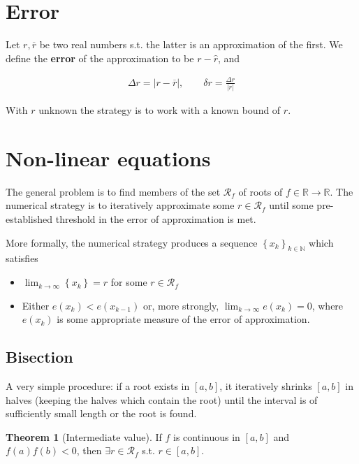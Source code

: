 \documentclass[12pt]{article}
\theoremstyle{definition}
\newtheorem{theorem}{Theorem}
\begin{document}
\pagebreak 

\section{Error}

Let $r, \overline{r}$ be two real numbers s.t. the latter is an approximation of
the first. We define the \textbf{error} of the approximation to be $r -
\hat{r}$, and 

\begin{align*}
    \Delta r = \left| r - \overline{r} \right|, \qquad \delta r = \frac{\Delta
    r}{\left| r \right| }
\end{align*}

With $r$ unknown the strategy is to work with a known bound of $r$.

\pagebreak 

\section{Non-linear equations}

The general problem is to find members of the set $\mathcal{R}_f$ of roots of $f
\in \mathbb{R} \to \mathbb{R}$. The numerical strategy is to iteratively
approximate some $r \in \mathcal{R}_f$ until some pre-established threshold in
the error of approximation is met. 

More formally, the numerical strategy produces a sequence $\left\{ x_k
\right\}_{k\in \mathbb{N}}
$ which satisfies 

\begin{itemize}
    \item $\lim_{k\to \infty} \left\{ x_k \right\} = r$  for some $r \in
        \mathcal{R}_f$ 
    \item Either $e(x_k) < e(x_{k-1})$ or, more strongly, $\lim_{k\to \infty}
        e(x_k) = 0$, where $e(x_k)$ is some appropriate measure of the error of
        approximation.
\end{itemize}

\subsection{Bisection}

A very simple procedure: if a root exists in $[a, b]$, it iteratively shrinks
$[a,b]$ in halves (keeping the halves which contain the root) until the interval
is of sufficiently small length or the root is found.

\begin{theorem}[Intermediate value]
    If $f$ is continuous in $[a, b]$ and $f(a)f(b) < 0$, then $\exists r \in
    \mathcal{R}_f$ s.t. $r \in [a, b]$.
\end{theorem}
\end{document}
